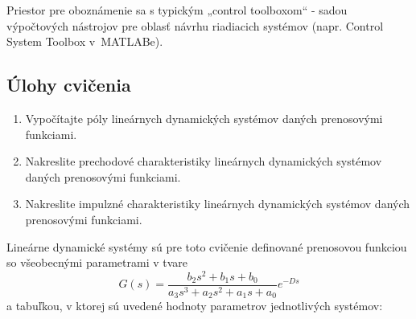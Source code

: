 \documentclass[a4paper, 10pt, ]{article}
\begin{document}
Priestor pre oboznámenie sa s typickým „control toolboxom“ - sadou výpočtových nástrojov pre oblasť návrhu riadiacich systémov (napr. Control System Toolbox v~MATLABe).

\subsection{Úlohy cvičenia}

\begin{enumerate}[leftmargin=0pt, labelsep=4mm, itemsep=0pt]

	\item Vypočítajte póly lineárnych dynamických systémov daných prenosovými funkciami.

	\item Nakreslite prechodové charakteristiky lineárnych dynamických systémov daných prenosovými funkciami.

	\item Nakreslite impulzné charakteristiky lineárnych dynamických systémov daných prenosovými funkciami.

\end{enumerate}


\noindent
Lineárne dynamické systémy sú pre toto cvičenie definované prenosovou funkciou so všeobecnými parametrami v tvare
\begin{equation*}
	G(s) = \frac{b_2 s^2 + b_1 s + b_0}{a_3 s^3 + a_2 s^2 + a_1 s + a_0} e^{-Ds}
\end{equation*}
a tabuľkou, v ktorej sú uvedené hodnoty parametrov jednotlivých systémov:



\bigskip
\end{document}
